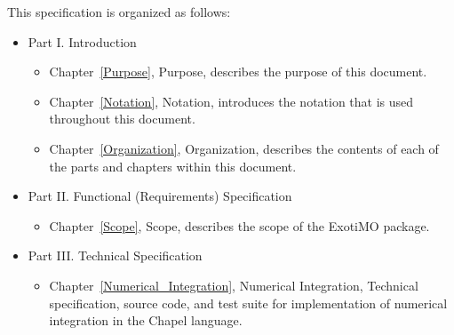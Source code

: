 \label{Organization}

This specification is organized as follows:

\begin{itemize}
\item 
Part I. Introduction

\begin{itemize}
\item
Chapter~\ref{Purpose}, Purpose, describes the purpose of this document.

\item
Chapter~\ref{Notation}, Notation, introduces the notation that is used
throughout this document.

\item
Chapter~\ref{Organization}, Organization, describes the contents of
each of the parts and chapters within this document.
\end{itemize}

\item
Part II. Functional (\ie Requirements) Specification

\begin{itemize}
\item
Chapter~\ref{Scope}, Scope, describes the scope of the ExotiMO package.
\end{itemize}

\item
Part III. Technical Specification
\begin{itemize}
\item
Chapter~\ref{Numerical_Integration}, Numerical Integration, Technical specification, source
code, and test suite for implementation of numerical integration in the Chapel language.
\end{itemize}



\end{itemize}
